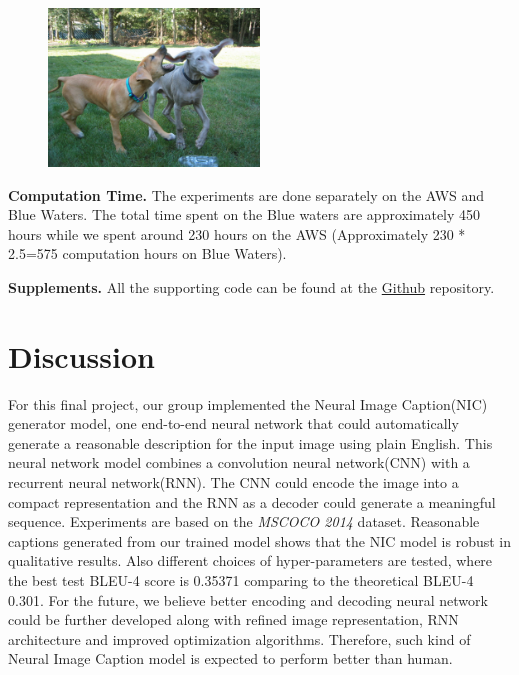 \documentclass[fleqn,10pt]{SelfArx} %
\begin{document}
\begin{figure}[H]
\centering
\includegraphics[width=0.5\textwidth]{dogs.png}
\end{figure}




\textbf{Computation Time.} The experiments are done separately on the AWS and Blue Waters. The total time spent on the Blue waters are approximately 450 hours while we spent around 230 hours on the AWS (Approximately 230 * 2.5=575 computation hours on Blue Waters).

\textbf{Supplements.} All the supporting code can be found at the \href{https://github.com/Rothdyt/Projects/tree/master/Show-and-tell}{Github} repository.


\section{Discussion}
For this final project, our group implemented the Neural Image Caption(NIC) generator model, one end-to-end neural network that could automatically generate a reasonable description for the input image using plain English. This neural network model combines a convolution neural network(CNN) with a recurrent neural network(RNN). The CNN could encode the image into a compact representation and the RNN as a decoder could generate a  meaningful sequence. Experiments are based on the \textit{MSCOCO 2014} dataset. Reasonable captions generated from our trained model shows that the NIC model is robust in qualitative results. Also different choices of hyper-parameters are tested, where the best test BLEU-4 score is 0.35371 comparing to the theoretical BLEU-4 0.301. For the future, we believe better encoding and decoding neural network could be further developed along with  refined image representation, RNN architecture and improved optimization algorithms. Therefore, such kind of Neural Image Caption model is expected to perform better than human.

\end{document}
